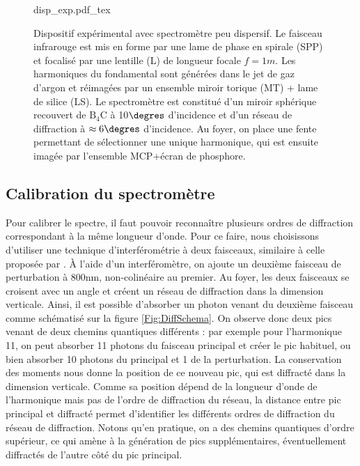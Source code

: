 \begin{figure}[!ht]
\centering
\def\svgwidth{\columnwidth}
{disp_exp.pdf_tex}
\caption{Dispositif expérimental avec spectromètre peu dispersif. Le faisceau infrarouge est mis en forme par une lame de phase en spirale (SPP) et focalisé par une lentille (L) de longueur focale $f=1m$. Les harmoniques du fondamental sont générées dans le jet de gaz d'argon et réimagées par un ensemble miroir torique (MT) + lame de silice (LS). Le spectromètre est constitué d'un miroir sphérique recouvert de $\mathrm{B}_\mathrm{4}\mathrm{C}$ à 10$\degres$ d'incidence et d'un réseau de diffraction à $\approx 6\degres$ d'incidence. Au foyer, on place une fente permettant de sélectionner une unique harmonique, qui est ensuite imagée par l'ensemble MCP+écran de phosphore.}
\label{Fig:DispHartmut}
\end{figure}

\subsection{Calibration du spectromètre}
\label{sec:calib}
Pour calibrer le spectre, il faut pouvoir reconnaître plusieurs ordres de diffraction correspondant à la même longueur d'onde. Pour ce faire, nous choisissons d'utiliser une technique d'interférométrie à deux faisceaux, similaire à celle proposée par . \`{A} l'aide d'un interféromètre, on ajoute un deuxième faisceau de perturbation à 800nm, non-colinéaire au premier. Au foyer, les deux faisceaux se croisent avec un angle et créent un réseau de diffraction dans la dimension verticale. Ainsi, il est possible d'absorber un photon venant du deuxième faisceau comme schématisé sur la figure \ref{Fig:DiffSchema}. On observe donc deux pics venant de deux chemins quantiques différents : par exemple pour l'harmonique 11, on peut absorber 11 photons du faisceau principal et créer le pic habituel, ou bien absorber 10 photons du principal et 1 de la perturbation. La conservation des moments nous donne la position de ce nouveau pic, qui est diffracté dans la dimension verticale. Comme sa position dépend de la longueur d'onde de l'harmonique mais pas de l'ordre de diffraction du réseau, la distance entre pic principal et diffracté permet d'identifier 
les différents ordres de diffraction du réseau de diffraction. Notons qu'en pratique, on a des chemins quantiques d'ordre supérieur, ce qui amène à la génération de pics supplémentaires, éventuellement diffractés de l'autre côté du pic principal.

